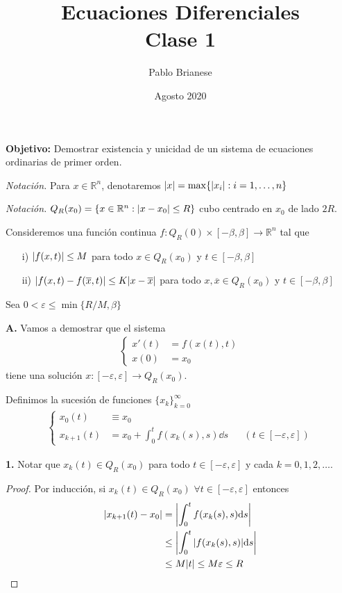 \documentclass{article}
\title{Ecuaciones Diferenciales\\Clase 1}
\author{Pablo Brianese}
\date{Agosto 2020}
\newcommand{\realnum}{\mathbb{R}}
\begin{document}
\maketitle

\textbf{Objetivo:}
Demostrar existencia y unicidad de un sistema de ecuaciones ordinarias de primer orden.

\textit{Notación.}
Para $x \in \realnum^n$, denotaremos $\abs{x} = \max \{ \abs{x_i} : i = 1, \dots, n\}$

\textit{Notación.}
$Q_R(x_0) = \{x \in \realnum^n : \abs{x - x_0} \leq R \}$ cubo centrado en $x_0$ de lado $2 R$.

Consideremos una función continua $f : Q_R(0) \times [- \beta, \beta] \rightarrow \realnum^n$ tal que
\begin{enumerate}
    \item[i)] $\abs{f(x, t)} \leq M$ para todo $x \in Q_R(x_0)$ y $t \in [- \beta, \beta]$
    \item[ii)] $\abs{f(x, t) - f(\overline{x}, t)} \leq K \abs{x - \overline{x}}$ para todo $x, \overline{x} \in Q_R(x_0)$ y $t \in [- \beta, \beta]$
\end{enumerate}

Sea $0 < \varepsilon \leq \min\{R / M, \beta\}$

\textbf{A.}
Vamos a demostrar que el sistema 
\begin{align}
    \left\{\begin{aligned}
    x'(t) &= f(x(t), t) \\
    x(0) &= x_0
    \end{aligned}\right.
\end{align}
tiene una solución $x : [- \varepsilon, \varepsilon] \rightarrow Q_R(x_0)$.

Definimos la sucesión de funciones $\{x_k\}_{k = 0}^{\infty}$
\begin{align}
    \left\{\begin{aligned}
    x_0(t) &\equiv x_0  \\
    x_{k + 1}(t) &= x_0 + \int_0^t f(x_k(s), s) \dd s &&(t \in [- \varepsilon, \varepsilon])
    \end{aligned}\right.
\end{align}

\textbf{1.}
Notar que $x_k(t) \in Q_R(x_0)$ para todo $t \in [- \varepsilon, \varepsilon]$ y cada $k = 0, 1, 2, \dots$.
\begin{proof}
Por inducción, si $x_k(t) \in Q_R(x_0)$ $\forall t \in [- \varepsilon, \varepsilon]$ entonces
\begin{align}
    \abs{x_{k + 1}(t) - x_0}
    &=
    \abs{\int_0^t f(x_k(s), s) \dd s}
    \\
    &\leq
    \abs{\int_0^t \abs{f(x_k(s), s)} \dd s}
    \\
    &\leq
    M \abs{t}
    \leq
    M \varepsilon
    \leq 
    R
\end{align}
\end{proof}
\end{document}
